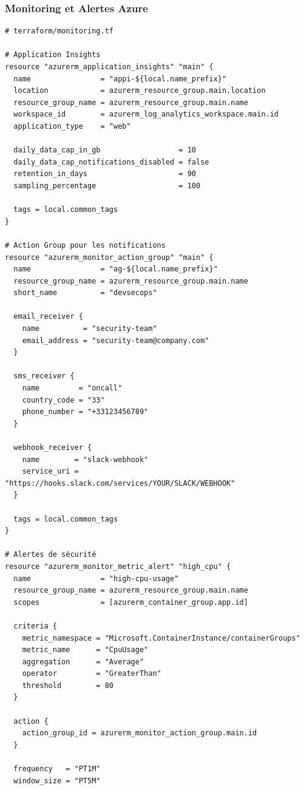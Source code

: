\documentclass[12pt,a4paper]{report}
\begin{document}
\subsubsection{Monitoring et Alertes Azure}

\begin{lstlisting}[language=hcl, caption=Configuration Azure Monitor et alertes]
# terraform/monitoring.tf

# Application Insights
resource "azurerm_application_insights" "main" {
  name                = "appi-${local.name_prefix}"
  location            = azurerm_resource_group.main.location
  resource_group_name = azurerm_resource_group.main.name
  workspace_id        = azurerm_log_analytics_workspace.main.id
  application_type    = "web"
  
  daily_data_cap_in_gb                  = 10
  daily_data_cap_notifications_disabled = false
  retention_in_days                     = 90
  sampling_percentage                   = 100
  
  tags = local.common_tags
}

# Action Group pour les notifications
resource "azurerm_monitor_action_group" "main" {
  name                = "ag-${local.name_prefix}"
  resource_group_name = azurerm_resource_group.main.name
  short_name          = "devsecops"
  
  email_receiver {
    name          = "security-team"
    email_address = "security-team@company.com"
  }
  
  sms_receiver {
    name         = "oncall"
    country_code = "33"
    phone_number = "+33123456789"
  }
  
  webhook_receiver {
    name        = "slack-webhook"
    service_uri = "https://hooks.slack.com/services/YOUR/SLACK/WEBHOOK"
  }
  
  tags = local.common_tags
}

# Alertes de sécurité
resource "azurerm_monitor_metric_alert" "high_cpu" {
  name                = "high-cpu-usage"
  resource_group_name = azurerm_resource_group.main.name
  scopes              = [azurerm_container_group.app.id]
  
  criteria {
    metric_namespace = "Microsoft.ContainerInstance/containerGroups"
    metric_name      = "CpuUsage"
    aggregation      = "Average"
    operator         = "GreaterThan"
    threshold        = 80
  }
  
  action {
    action_group_id = azurerm_monitor_action_group.main.id
  }
  
  frequency   = "PT1M"
  window_size = "PT5M"
  

\end{lstlisting}
\end{document}
